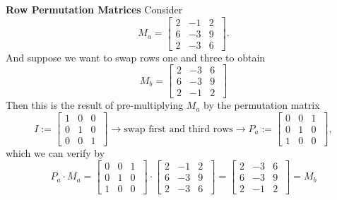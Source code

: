 \textbf{Row Permutation Matrices}
Consider $$M_{a}=\left[ \begin{array}{rrr} 2 & -1 & 2\\
 6 & -3& 9 \\ 2 & -3 & 6  \end{array}\ \right].$$ And suppose we want to swap rows one and three to obtain
  $$M_{b}=\left[ \begin{array}{rrr} 2 & -3 & 6\\
 6 & -3& 9 \\  2 & -1 & 2 \end{array}\ \right]$$
 Then this is the result of pre-multiplying $M_a$ by the permutation matrix
 $$I:= \left[ \begin{array}{rrr} 1 & 0 & 0\\
 0 & 1& 0 \\ 0 & 0 & 1 \end{array}\ \right] \rightarrow \text{swap first and third rows} \rightarrow P_a:=\left[ \begin{array}{rrr} 0 & 0 & 1\\
 0 & 1& 0 \\ 1 & 0 & 0 \end{array}\ \right],$$
 which we can verify by 
 $$P_a \cdot M_a = \left[ \begin{array}{rrr} 0 & 0 & 1\\
 0 & 1& 0 \\ 1 & 0 & 0 \end{array}\ \right] \cdot\left[ \begin{array}{rrr} 2 & -1 & 2\\
 6 & -3& 9 \\ 2 & -3 & 6  \end{array}\ \right] = \left[ \begin{array}{rrr} 2 & -3 & 6\\
 6 & -3& 9 \\  2 & -1 & 2 \end{array}\ \right] = M_b$$
 

